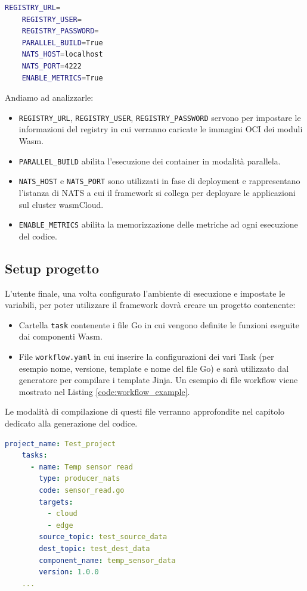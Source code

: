 \begin{lstlisting}[language=bash, caption={Variabili d'ambiente per la configurazione del framework}, captionpos=b, label={code:env}]
    REGISTRY_URL=
    REGISTRY_USER=
    REGISTRY_PASSWORD=
    PARALLEL_BUILD=True
    NATS_HOST=localhost
    NATS_PORT=4222
    ENABLE_METRICS=True
\end{lstlisting}

Andiamo ad analizzarle:
\begin{itemize}
    \item \texttt{REGISTRY\_URL}, \texttt{REGISTRY\_USER}, \texttt{REGISTRY\_PASSWORD} servono per impostare le informazioni del registry in cui verranno caricate le immagini OCI dei moduli Wasm.
    \item \texttt{PARALLEL\_BUILD} abilita l'esecuzione dei container in modalità parallela.
    \item \texttt{NATS\_HOST} e \texttt{NATS\_PORT} sono utilizzati in fase di deployment e rappresentano l'istanza di NATS a cui il framework si collega per deployare le applicazioni sul cluster wasmCloud.
    \item \texttt{ENABLE\_METRICS} abilita la memorizzazione delle metriche ad ogni esecuzione del codice.
\end{itemize}

\subsection{Setup progetto}

L'utente finale, una volta configurato l'ambiente di esecuzione e impostate le variabili, per poter utilizzare il framework dovrà creare un progetto contenente:
\begin{itemize}
    \item Cartella \texttt{task} contenente i file Go in cui vengono definite le funzioni eseguite dai componenti Wasm.
    \item File \texttt{workflow.yaml} in cui inserire la configurazioni dei vari Task (per esempio nome, versione, template e nome del file Go) e sarà utilizzato dal generatore per compilare i template Jinja. Un esempio di file workflow viene mostrato nel Listing \ref{code:workflow_example}.    
\end{itemize}
Le modalità di compilazione di questi file verranno approfondite nel capitolo dedicato alla generazione del codice.

\begin{lstlisting}[language=yaml, caption={Esempio workflow.yaml}, captionpos=b, label={code:workflow_example}]
    project_name: Test_project
    tasks:
      - name: Temp sensor read
        type: producer_nats
        code: sensor_read.go
        targets:
          - cloud
          - edge
        source_topic: test_source_data
        dest_topic: test_dest_data
        component_name: temp_sensor_data
        version: 1.0.0
    ...
\end{lstlisting}


